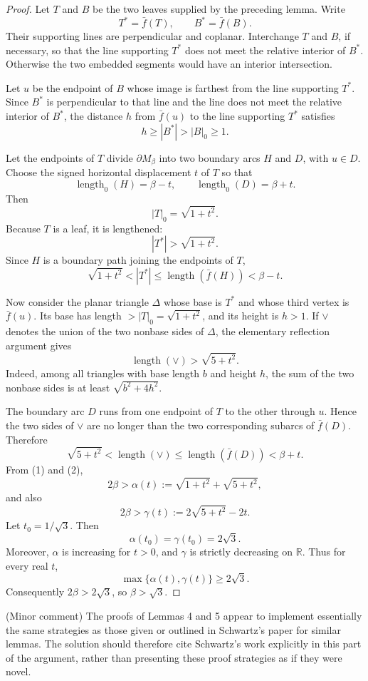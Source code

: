 \documentclass[12pt]{article}
\newcommand{\R}{\mathbb R}
\newcommand{\len}{\operatorname{length}}
\newcommand{\review}[1]{\begin{reviewbox}#1\end{reviewbox}}
\begin{document}
\begin{proof}
Let \(T\) and \(B\) be the two leaves supplied by the preceding lemma.  Write
\[
T^*=\bar f(T),\qquad B^*=\bar f(B).
\]
Their supporting lines are perpendicular and coplanar.  Interchange \(T\) and \(B\), if necessary, so that the line supporting \(T^*\) does not meet the relative interior of \(B^*\).  Otherwise the two embedded segments would have an interior intersection.

Let \(u\) be the endpoint of \(B\) whose image is farthest from the line supporting \(T^*\).  Since \(B^*\) is perpendicular to that line and the line does not meet the relative interior of \(B^*\), the distance \(h\) from \(\bar f(u)\) to the line supporting \(T^*\) satisfies
\[
h\ge |B^*|>|B|_0\ge 1.
\]

Let the endpoints of \(T\) divide \(\partial M_\beta\) into two boundary arcs \(H\) and \(D\), with \(u\in D\).  Choose the signed horizontal displacement \(t\) of \(T\) so that
\[
\len_0(H)=\beta-t,\qquad \len_0(D)=\beta+t.
\]
Then
\[
|T|_0=\sqrt{1+t^2}.
\]
Because \(T\) is a leaf, it is lengthened:
\[
|T^*|>\sqrt{1+t^2}.
\]
Since \(H\) is a boundary path joining the endpoints of \(T\),
\[
\sqrt{1+t^2}<|T^*|\le \len(\bar f(H))<\beta-t. \tag{1}
\]

Now consider the planar triangle \(\Delta\) whose base is \(T^*\) and whose third vertex is \(\bar f(u)\).  Its base has length \(>|T|_0=\sqrt{1+t^2}\), and its height is \(h>1\).  If \(\vee\) denotes the union of the two nonbase sides of \(\Delta\), the elementary reflection argument gives
\[
\len(\vee)>\sqrt{5+t^2}.
\]
Indeed, among all triangles with base length \(b\) and height \(h\), the sum of the two nonbase sides is at least \(\sqrt{b^2+4h^2}\).

The boundary arc \(D\) runs from one endpoint of \(T\) to the other through \(u\).  Hence the two sides of \(\vee\) are no longer than the two corresponding subarcs of \(\bar f(D)\).  Therefore
\[
\sqrt{5+t^2}<\len(\vee)\le \len(\bar f(D))<\beta+t. \tag{2}
\]
From (1) and (2),
\[
2\beta>\alpha(t):=\sqrt{1+t^2}+\sqrt{5+t^2},
\]
and also
\[
2\beta>\gamma(t):=2\sqrt{5+t^2}-2t.
\]
Let \(t_0=1/\sqrt3\).  Then
\[
\alpha(t_0)=\gamma(t_0)=2\sqrt3.
\]
Moreover, \(\alpha\) is increasing for \(t>0\), and \(\gamma\) is strictly decreasing on \(\R\).  Thus for every real \(t\),
\[
\max\{\alpha(t),\gamma(t)\}\ge 2\sqrt3.
\]
Consequently \(2\beta>2\sqrt3\), so \(\beta>\sqrt3\).
\end{proof}

\review{(Minor comment) The proofs of Lemmas 4 and 5 appear to implement essentially the same strategies as those given or outlined in Schwartz's paper for similar lemmas. The solution should therefore cite Schwartz's work explicitly in this part of the argument, rather than presenting these proof strategies as if they were novel.}
\end{document}
